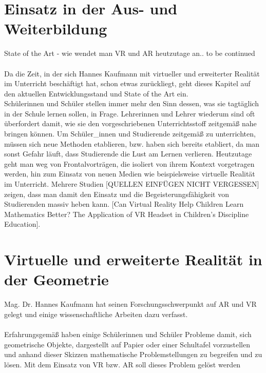 \documentclass[deutsch]{llncs}
\begin{document}
\section{Einsatz in der Aus- und Weiterbildung}
\label{sec:typo}
State of the Art - wie wendet man VR und AR heutzutage an.. to be continued \\
\noindent \\
Da die Zeit, in der sich Hannes Kaufmann mit virtueller und erweiterter Realität im Unterricht beschäftigt hat, schon etwas zurückliegt, geht dieses Kapitel auf den aktuellen Entwicklungsstand und State of the Art ein. \\
Schülerinnen und Schüler stellen immer mehr den Sinn dessen, was sie tagtäglich in der Schule lernen sollen, in Frage. Lehrerinnen und Lehrer wiederum sind oft überfordert damit, wie sie den vorgeschriebenen Unterrichtsstoff zeitgemäß nahe bringen können. Um Schüler\_innen und Studierende zeitgemäß zu unterrichten, müssen sich neue Methoden etablieren, bzw. haben sich bereits etabliert, da man sonst Gefahr läuft, dass Studierende die Lust am Lernen verlieren. Heutzutage geht man weg von Frontalvorträgen, die isoliert von ihrem Kontext vorgetragen werden, hin zum Einsatz von neuen Medien wie beispielsweise virtuelle Realität im Unterricht. Mehrere Studien [QUELLEN EINFÜGEN NICHT VERGESSEN] zeigen, dass man damit den Einsatz und die Begeisterungsfähigkeit von Studierenden massiv heben kann.
\cite{2}
[Can Virtual Reality Help Children Learn Mathematics Better? The Application of VR Headset in Children’s Discipline Education].


\section{Virtuelle und erweiterte Realität in der Geometrie}
Mag. Dr. Hannes Kaufmann hat seinen Forschungsschwerpunkt auf AR und VR gelegt und einige wissenschaftliche Arbeiten dazu verfasst. \\
\noindent \\
Erfahrungsgemäß haben einige Schülerinnen und Schüler Probleme damit, sich geometrische Objekte, dargestellt auf Papier oder einer Schultafel vorzustellen und anhand dieser Skizzen mathematische Problemstellungen zu begreifen und zu lösen. Mit dem Einsatz von VR bzw. AR soll dieses Problem gelöst werden

\label{sec:typo}
\end{document}
